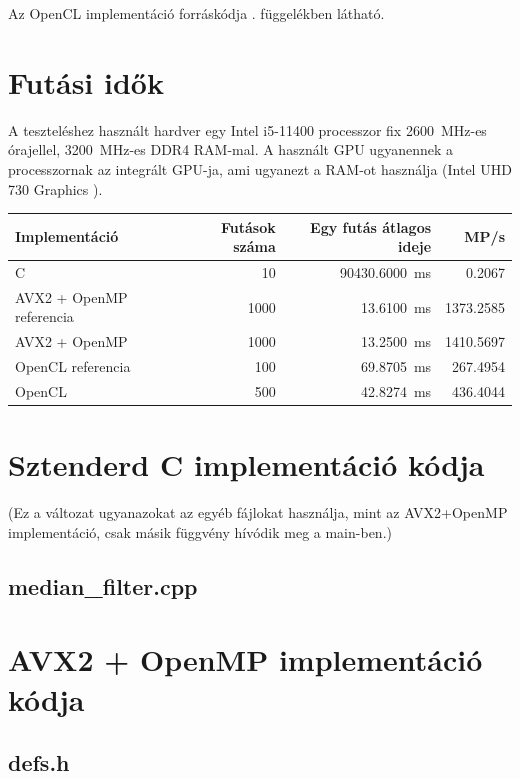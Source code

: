 			Az OpenCL implementáció forráskódja . függelékben látható.


\clearpage
	\section{Futási idők}
		A teszteléshez használt hardver egy Intel i5-11400 processzor fix \qty{2600}{MHz}-es órajellel, \qty{3200}{MHz}-es DDR4 RAM-mal. A használt GPU ugyanennek a processzornak az integrált GPU-ja, ami ugyanezt a RAM-ot használja (Intel UHD 730 Graphics \cite{intel-opt-guide}).\\[3ex]
		\begin{tabular}{|l||r|r|r|}
			\hline
			Implementáció & Futások száma & Egy futás átlagos ideje & MP/s\\
			\hline
			\hline
			C & 10 & \qty{90430.6000}{ms} & \qty{0.2067}{}\\
			\hline
			AVX2 + OpenMP referencia & 1000 & \qty{13.6100}{ms} & \qty{1373.2585}{} \\
			\hline
			AVX2 + OpenMP & 1000 & \qty{13.2500}{ms} & \qty{1410.5697}{} \\
			\hline
			OpenCL referencia & 100 & \qty{69.8705}{ms} & \qty{267.4954}{} \\
			\hline
			OpenCL & 500 & \qty{42.8274}{ms} & \qty{436.4044}{} \\
			\hline
		\end{tabular}

	\clearpage
	
	
	
	\appendix
	\clearpage
	\section{Sztenderd C implementáció kódja}
		(Ez a változat ugyanazokat az egyéb fájlokat használja, mint az AVX2+OpenMP implementáció, csak másik függvény hívódik meg a main-ben.)
		\subsection{median\_filter.cpp}
			\label{appendix:skalar}
			
	\clearpage
	\section{AVX2 + OpenMP implementáció kódja}
		\subsection{defs.h}
			
